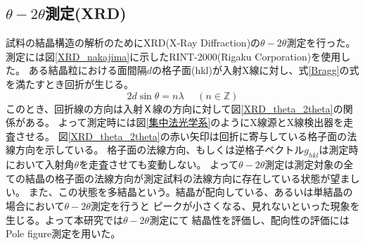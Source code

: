\documentclass[dvipdfmx,12pt,a4paper]{jreport}
\begin{document}
			\subsection{$\theta - 2\theta$測定(XRD)}
			試料の結晶構造の解析のためにXRD(X-Ray Diffraction)の$\theta-2\theta$測定を行った。
			測定には図\ref{XRD_nakajima}に示したRINT-2000(Rigaku Corporation)を使用した。
			ある結晶粒における面間隔$d$の格子面(hkl)が入射X線に対し、式\ref{Bragg}の式を満たすとき回折が生じる。
			\begin{equation}
				2d \sin \theta = n \lambda \ \ \ \ \ \ (n\in \mathbb{Z})
				\label{Bragg}
			\end{equation}
			このとき、回折線の方向は入射Ｘ線の方向に対して図\ref{XRD_theta_2theta}の関係がある。
			よって測定時には図\ref{集中法光学系}のようにX線源とX線検出器を走査させる。
			図\ref{XRD_theta_2theta}の赤い矢印は回折に寄与している格子面の法線方向を示している。
			格子面の法線方向、もしくは逆格子ベクトル$g_{hkl}$は測定時において入射角$\theta$を走査させても変動しない。
			よって$\theta-2\theta$測定は測定対象の全ての結晶の格子面の法線方向が測定試料の法線方向に存在している状態が望ましい。
			また、この状態を多結晶という。結晶が配向している、あるいは単結晶の場合において$\theta-2\theta$測定を行うと
			ピークが小さくなる、見れないといった現象を生じる。よって本研究では$\theta-2\theta$測定にて
			結晶性を評価し、配向性の評価にはPole figure測定を用いた。
\end{document}
